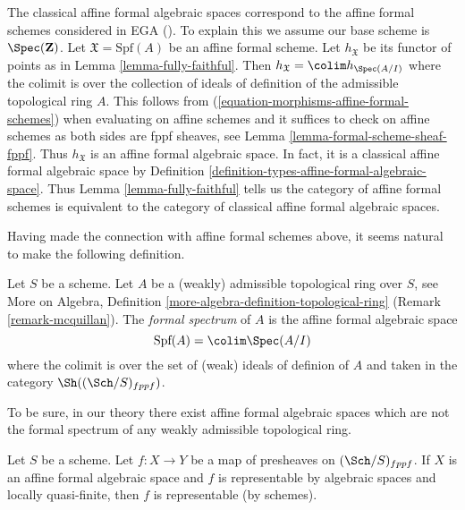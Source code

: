 \begin{remark}
\label{remark-compare-with-affine-formal-schemes}
The classical affine formal algebraic spaces correspond to the
affine formal schemes considered in EGA (\cite{EGA}). To explain this
we assume our base scheme is $\Spec(\mathbf{Z})$. Let
$\mathfrak X = \text{Spf}(A)$ be an affine formal scheme.
Let $h_\mathfrak X$ be its functor of points as in
Lemma \ref{lemma-fully-faithful}.
Then $h_\mathfrak X = \colim h_{\Spec(A/I)}$ where the colimit
is over the collection of ideals of definition of the admissible
topological ring $A$. This follows from
(\ref{equation-morphisms-affine-formal-schemes})
when evaluating on affine schemes and it suffices to check
on affine schemes as both sides are fppf sheaves, see
Lemma \ref{lemma-formal-scheme-sheaf-fppf}.
Thus $h_\mathfrak X$ is an affine formal algebraic space.
In fact, it is a classical affine formal algebraic space
by Definition \ref{definition-types-affine-formal-algebraic-space}.
Thus Lemma \ref{lemma-fully-faithful} tells us
the category of affine formal schemes is equivalent to the category
of classical affine formal algebraic spaces.
\end{remark}

\noindent
Having made the connection with affine formal schemes above,
it seems natural to make the following definition.

\begin{definition}
\label{definition-affine-formal-spectrum}
Let $S$ be a scheme. Let $A$ be a (weakly) admissible topological ring over
$S$, see More on Algebra, Definition
\ref{more-algebra-definition-topological-ring} (Remark \ref{remark-mcquillan}).
The {\it formal spectrum} of $A$ is the affine formal algebraic space
$$
\text{Spf}(A) = \colim \Spec(A/I)
$$
where the colimit is over the set of (weak) ideals of definion of $A$
and taken in the category $\Sh((\Sch/S)_{fppf})$.
\end{definition}

\noindent
To be sure, in our theory there exist affine formal algebraic spaces
which are not the formal spectrum of any weakly admissible topological ring.

\begin{lemma}
\label{lemma-presentation-representable}
Let $S$ be a scheme. Let $f : X \to Y$ be a map
of presheaves on $(\Sch/S)_{fppf}$. If $X$ is an affine formal algebraic
space and $f$ is representable by algebraic spaces and locally quasi-finite,
then $f$ is representable (by schemes).
\end{lemma}

